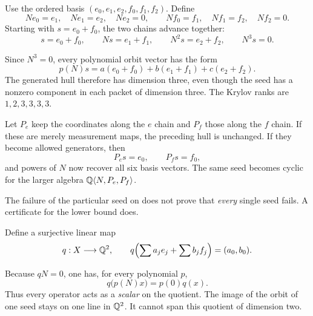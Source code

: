 Use the ordered basis $(e_0,e_1,e_2,f_0,f_1,f_2)$. Define
\[
Ne_0=e_1,\quad Ne_1=e_2,\quad Ne_2=0,
\qquad Nf_0=f_1,\quad Nf_1=f_2,\quad Nf_2=0.
\]
Starting with $s=e_0+f_0$, the two chains advance together:
\[
s=e_0+f_0,\qquad Ns=e_1+f_1,\qquad N^2s=e_2+f_2,\qquad N^3s=0.
\]


Since $N^3=0$, every polynomial orbit vector has the form
\[
p(N)s=a(e_0+f_0)+b(e_1+f_1)+c(e_2+f_2).
\]
The generated hull therefore has dimension three, even though the seed has a nonzero component in each packet of dimension three. The Krylov ranks are $1,2,3,3,3,3$.

Let $P_e$ keep the coordinates along the $e$ chain and $P_f$ those along the $f$ chain. If these are merely measurement maps, the preceding hull is unchanged. If they become allowed generators, then
\[
P_es=e_0,\qquad P_fs=f_0,
\]
and powers of $N$ now recover all six basis vectors. The same seed becomes cyclic for the larger algebra $\mathbb Q\langle N,P_e,P_f\rangle$.


The failure of the particular seed on  does not prove that \emph{every} single seed fails. A certificate for the lower bound does.

Define a surjective linear map
\[
q:X\longrightarrow\mathbb Q^2,\qquad
q\Bigl(\sum a_je_j+\sum b_jf_j\Bigr)=(a_0,b_0).
\]


Because $qN=0$, one has, for every polynomial $p$,
\[
q\bigl(p(N)x\bigr)=p(0)q(x).
\]
Thus every operator acts as a \emph{scalar} on the quotient. The image of the orbit of one seed stays on one line in $\mathbb Q^2$. It cannot span this quotient of dimension two.

